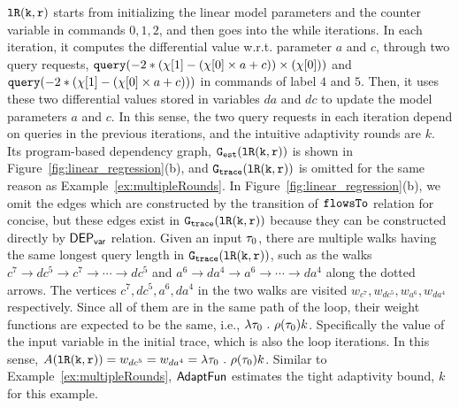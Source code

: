     $\mathtt{lR(k, r)}$ starts from initializing the linear model parameters and the counter variable in commands $0, 1, 2$,
    and then goes into the while iterations.
    In each iteration, it computes the differential value w.r.t. parameter
    $a$ and $c$,
    through two query requests, 
    ${\tt query}(-2 * (\chi[1] - (\chi[0]\times a + c)) \times (\chi[0]))$ and 
    ${\tt query}(-2 * (\chi[1] - (\chi[0]\times a + c)))$
    in commands of label $4$ and $5$.
    Then, it uses these two differential values stored in variables $da$ and $dc$
    to update the model parameters $a$ and $c$.
    In this sense, the two query requests in each iteration depend on queries in the previous iterations, and the intuitive adaptivity rounds are $k$.
    Its program-based dependency graph, $\mathtt{{G_{est}}}(\mathtt{lR(k, r)})$ is shown in Figure~\ref{fig:linear_regression}(b),
    and $\mathtt{{G_{trace}}}(\mathtt{lR(k, r)})$ is omitted for the same reason as Example~\ref{ex:multipleRounds}.
     In Figure~\ref{fig:linear_regression}(b), we omit the edges which are constructed by the transition of $\mathtt{flowsTo}$ relation
    for concise, but these edges exist in $\mathtt{{G_{trace}}}(\mathtt{lR(k, r)})$ because they can be constructed directly by $\mathsf{DEP_{var}}$ relation.
    Given an input $\mathtt{\tau}_0$, there are multiple walks having the same longest query length in 
    $\mathtt{{G_{trace}}}(\mathtt{lR(k, r)})$,
    such as the walks 
    $c^7 \to dc^5 \to c^7 \to \cdots \to dc^5$ and
    $a^6 \to da^4 \to a^6 \to \cdots \to da^4 $ along the 
    dotted arrows.
    The vertices $c^7, dc^5, a^6, da^4$ in the two walks are visited $w_{c^7}, w_{dc^5}, w_{a^6}, w_{da^4}$ respectively.
    Since all of them are in the same path of the loop, their weight functions are expected to be the same, i.e., 
    $\lambda \mathtt{\tau}_0 ~.~ \rho(\mathtt{\tau}_0) k$. 
    Specifically the value of the input variable in the initial trace, which is also the loop iterations.
    In this sense, $A(\mathtt{lR(k, r)}) = w_{dc^5} = w_{da^4} = \lambda \mathtt{\tau}_0 ~.~ \rho(\mathtt{\tau}_0) k$.
    Similar to Example~\ref{ex:multipleRounds}, $\textsf{AdaptFun}$ estimates the tight adaptivity bound, $k$ for this example.